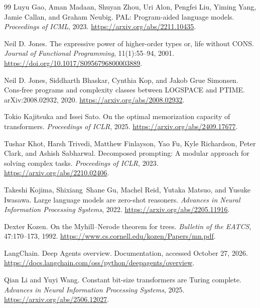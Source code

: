 \documentclass[11pt,twoside]{article}
\theoremstyle{definition}
\theoremstyle{remark}
\begin{document}
\begin{thebibliography}{99}
Luyu Gao, Aman Madaan, Shuyan Zhou, Uri Alon, Pengfei Liu,
Yiming Yang, Jamie Callan, and Graham Neubig.
\newblock PAL: Program-aided language models.
\newblock \emph{Proceedings of ICML}, 2023.
\newblock \url{https://arxiv.org/abs/2211.10435}.

Neil D. Jones.
\newblock The expressive power of higher-order types or, life without CONS.
\newblock \emph{Journal of Functional Programming}, 11(1):55--94, 2001.
\newblock \url{https://doi.org/10.1017/S0956796800003889}.

Neil D. Jones, Siddharth Bhaskar, Cynthia Kop, and Jakob Grue Simonsen.
\newblock Cons-free programs and complexity classes between LOGSPACE and PTIME.
\newblock arXiv:2008.02932, 2020.
\newblock \url{https://arxiv.org/abs/2008.02932}.

Tokio Kajitsuka and Issei Sato.
\newblock On the optimal memorization capacity of transformers.
\newblock \emph{Proceedings of ICLR}, 2025.
\newblock \url{https://arxiv.org/abs/2409.17677}.

Tushar Khot, Harsh Trivedi, Matthew Finlayson, Yao Fu,
Kyle Richardson, Peter Clark, and Ashish Sabharwal.
\newblock Decomposed prompting: A modular approach for solving complex tasks.
\newblock \emph{Proceedings of ICLR}, 2023.
\newblock \url{https://arxiv.org/abs/2210.02406}.

Takeshi Kojima, Shixiang~Shane Gu, Machel Reid, Yutaka Matsuo, and Yusuke Iwasawa.
\newblock Large language models are zero-shot reasoners.
\newblock \emph{Advances in Neural Information Processing Systems}, 2022.
\newblock \url{https://arxiv.org/abs/2205.11916}.

Dexter Kozen.
\newblock On the Myhill--Nerode theorem for trees.
\newblock \emph{Bulletin of the EATCS}, 47:170--173, 1992.
\newblock \url{https://www.cs.cornell.edu/kozen/Papers/mn.pdf}.

LangChain.
\newblock Deep Agents overview.
\newblock Documentation, accessed October 27, 2026.
\newblock \url{https://docs.langchain.com/oss/python/deepagents/overview}.

Qian Li and Yuyi Wang.
\newblock Constant bit-size transformers are Turing complete.
\newblock \emph{Advances in Neural Information Processing Systems}, 2025.
\newblock \url{https://arxiv.org/abs/2506.12027}.


\end{thebibliography}
\end{document}
